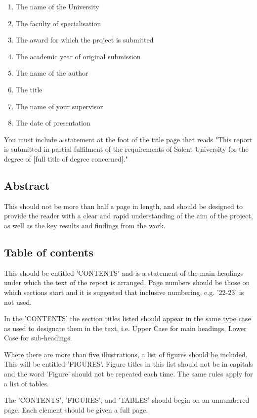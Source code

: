 \begin{enumerate}
    \item The name of the University
    \item The faculty of specialisation
    \item The award for which the project is submitted
    \item The academic year of original submission
    \item The name of the author
    \item The title
    \item The name of your supervisor
    \item The date of presentation
\end{enumerate}

You must include a statement at the foot of the title page that reads "This report is submitted in partial fulfilment of the requirements of Solent University for the degree of [full title of degree concerned]."


\subsection{Abstract}

This should not be more than half a page in length, and should be designed to provide the reader with a clear and rapid understanding of the aim of the project, as well as the key results and findings from the work.

\subsection{Table of contents}

This should be entitled 'CONTENTS' and is a statement of the main headings under which the text of the report is arranged. Page numbers should be those on which sections start and it is suggested that inclusive numbering, e.g. '22-23' is not used.

In the 'CONTENTS' the section titles listed should appear in the same type case as used to designate them in the text, i.e. Upper Case for main headings, Lower Case for sub-headings. 

Where there are more than five illustrations, a list of figures should be included. This will be entitled 'FIGURES'. Figure titles in this list should not be in capitals and the word 'Figure' should not be repeated each time. The same rules apply for a list of tables. 

The 'CONTENTS', 'FIGURES', and 'TABLES' should begin on an unnumbered page. Each element should be given a full page.

